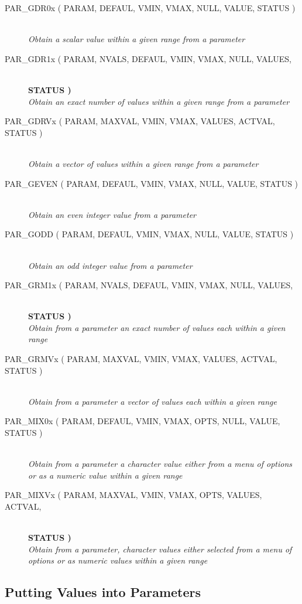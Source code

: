 \documentclass[twoside,11pt]{article}
\newcommand{\htmlref}[2]{#1}
\newcommand{\xlabel}[1]{}
\newcommand{\listline}{\hspace{1pt}\\}
\newcommand{\listova}[1]{}
\newcommand{\listovb}[1]{\textbf{#1}\\}
\newcommand{\listline}{}
\newcommand{\listova}[1]{#1}
\newcommand{\listovb}[1]{}
\begin{document}
\begin{description}
\item [\htmlref{PAR\_GDR0x}{PAR_GDR0x} 
( PARAM, DEFAUL, VMIN, VMAX, NULL, VALUE, STATUS )] \listline
\textit{Obtain a scalar value within a given range from a parameter}
\item [\htmlref{PAR\_GDR1x}{PAR_GDR1x} 
( PARAM, NVALS, DEFAUL, VMIN, VMAX, NULL, VALUES, \listova{STATUS )}] \listline
\listovb{STATUS )}
\textit{Obtain an exact number of values within a given range from a parameter}
\item [\htmlref{PAR\_GDRVx}{PAR_GDRVx} 
( PARAM, MAXVAL, VMIN, VMAX, VALUES, ACTVAL, STATUS )] \listline
\textit{Obtain a vector of values within a given range from a parameter}
\item [\htmlref{PAR\_GEVEN}{PAR_GEVEN} 
( PARAM, DEFAUL, VMIN, VMAX, NULL, VALUE, STATUS )] \listline
\textit{Obtain an even integer value from a parameter}
\item [\htmlref{PAR\_GODD}{PAR_GODD} 
( PARAM, DEFAUL, VMIN, VMAX, NULL, VALUE, STATUS )] \listline
\textit{Obtain an odd integer value from a parameter}
\item [\htmlref{PAR\_GRM1x}{PAR_GRM1x} 
( PARAM, NVALS, DEFAUL, VMIN, VMAX, NULL, VALUES, \listova{STATUS )}] \listline
\listovb{STATUS )}
\textit{Obtain from a parameter an exact number of values each within a
             given range}
\item [\htmlref{PAR\_GRMVx}{PAR_GRMVx} 
( PARAM, MAXVAL, VMIN, VMAX, VALUES, ACTVAL, STATUS )] \listline
\textit{Obtain from a parameter a vector of values each within a given
             range}
\item [\htmlref{PAR\_MIX0x}{PAR_MIX0x} 
( PARAM, DEFAUL, VMIN, VMAX, OPTS, NULL, VALUE, STATUS )] \listline
\textit{Obtain from a parameter a character value either from a menu of
             options or as a numeric value within a given range}
\item [\htmlref{PAR\_MIXVx}{PAR_MIXVx} 
( PARAM, MAXVAL, VMIN, VMAX, OPTS, VALUES, ACTVAL, \listova{STATUS )}] \listline
\listovb{STATUS )}
\textit{Obtain from a parameter, character values either selected from a
             menu of options or as numeric values within a given range}
\end{description}


\subsection{\xlabel{putting_values_into_parameters}Putting Values into Parameters}
\end{document}
